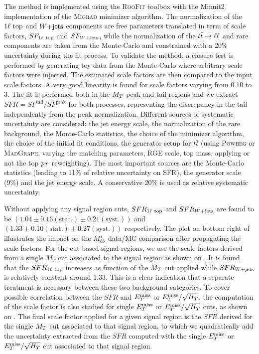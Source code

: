     The method is implemented using the \textsc{RooFit} toolbox \cite{RooFit} with the Minuit2
    implementation of the \textsc{Migrad} minimizer algorithm. The normalization
    of the $1\ell~\text{top}$ and $\text{$W$+jets}$ components are free parameters translated in term
    of scale factors, $SF_{1\ell~\text{top}}$ and $SF_{\text{$W$+jets}}$, while the normalization of
    the $t\bar{t} \rightarrow \ell \ell$ and rare components are taken from the Monte-Carlo and constrained
    with a 20\% uncertainty during the fit process. To validate the method, a closure test
    is performed by generating toy data from the Monte-Carlo where arbitrary scale factors
    were injected. The estimated scale factors are then compared to the input scale factors.
    A very good linearity is found for scale factors varying from 0.10 to 3. The fit is
    performed both in the $M_T$ peak and tail regions and we extract $SFR = SF^{\text{tail}}
    / SF^{\text{peak}}$ for both processes, representing the discrepancy in the tail
    independently from the peak normalization. Different sources of systematic uncertainty
    are considered: the jet energy scale, the normalization of the rare background, the
    Monte-Carlo statistics, the choice of the minimizer algorithm, the choice of the
    initial fit conditions, the generator setup for $t\bar{t}$ (using \textsc{Powheg} or
    \textsc{MadGraph}, varying the matching parameters, RGE scale, top mass, applying or
    not the top $p_T$ reweighting). The most important sources are the Monte-Carlo statistics
    (leading to 11\% of relative uncertainty on SFR), the generator scale (9\%) and the jet
    energy scale. A conservative 20\% is used as relative systematic uncertainty.

    Without applying any signal region cuts, $SFR_{1\ell~\text{top}}$ and $SFR_{\text{$W$+jets}}$ are found
    to be $(1.04 \pm 0.16 (\text{stat.}) \pm 0.21 (\text{syst.}))$ and $(1.33 \pm 0.10
    (\text{stat.}) \pm 0.27 (\text{syst.}) )$ respectively. The plot on bottom right
    of 
    illustrates the impact on the $M'_{\ell b}$ data/MC comparison after propagating the scale
    factors. For the cut-based signal regions, we use the scale factors derived from a
    single $M_T$ cut associated to the signal region as shown on .
    It is found that the $SFR_{1\ell~\text{top}}$ increases as function of the $M_T$ cut applied
    while $SFR_{\text{$W$+jets}}$ is relatively constant around 1.33. This is a clear indication that
    a separate treatment is necessary between these two background categories.
    To cover possible correlation between the $SFR$ and $E_T^\text{miss}$ or $E_T^\text{miss}/\sqrt{H_T}$, the
    computation of the scale factor is also studied for single $E_T^\text{miss}$ or $E_T^\text{miss}/\sqrt{H_T}$ cuts,
    as shown on .
    The final scale factor applied for a given signal region is the $SFR$ derived
    for the single $M_T$ cut associated to that signal region, to which we quadratically add
    the uncertainty extracted from the $SFR$ computed with the single $E_T^\text{miss}$ or
    $E_T^\text{miss}/\sqrt{H_T}$ cut associated to that signal region.


